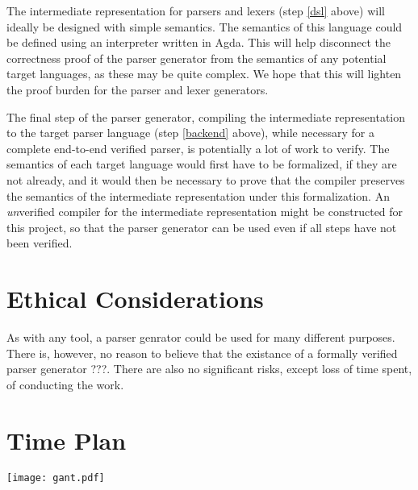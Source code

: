 \documentclass{article}
\begin{document}
	The intermediate representation for parsers and lexers (step \ref{dsl}
	above) will ideally be designed with simple semantics. The semantics of
	this language could be defined using an interpreter written in Agda. This
	will help disconnect the correctness proof of the parser generator from the
	semantics of any potential target languages, as these may be quite complex.
	We hope that this will lighten the proof burden for the parser and lexer
	generators.


	The final step of the parser generator, compiling the intermediate
	representation to the target parser language (step \ref{backend} above),
	while necessary for a complete end-to-end verified parser, is potentially a
	lot of work to verify. The semantics of each target language would first
	have to be formalized, if they are not already, and it would then be
	necessary to prove that the compiler preserves the semantics of the
	intermediate representation under this formalization. An \emph{un}verified
	compiler for the intermediate representation might be constructed for this
	project, so that the parser generator can be used even if all steps have
	not been verified.




\section{Ethical Considerations}
	
	As with any tool, a parser genrator could be used for many different
	purposes.  There is, however, no reason to believe that the existance of a
	formally verified parser generator ???. There are also no significant
	risks, except loss of time spent, of conducting the work.

\section{Time Plan}

	\texttt{[image: gant.pdf]}

\newpage




\end{document}
